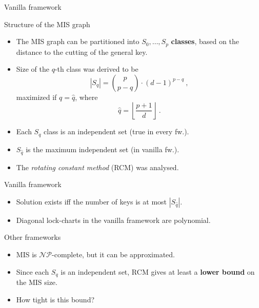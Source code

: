 \begin{frame}{Vanilla framework}
  \begin{block}{Structure of the MIS graph}
    \begin{itemize}
      \item The MIS graph can be partitioned into $S_0, \ldots, S_p$ \textbf{classes},
        based on the distance to the cutting of the general key.
      \item Size of the $q$-th class was derived to be
        $$|S_q| = \binom{p}{p-q}\cdot (d-1)^{p-q}\ ,$$
        maximized if $q=\hat q$, where
        $$\hat{q}=\left\lfloor \frac{p+1}{d}\right\rfloor\ .$$
      \pause
      \item Each $S_q$ class is an independent set (true in every fw.).
      \item $S_{\hat{q}}$ is the maximum independent set (in vanilla fw.).
      \pause
      \item The \textit{rotating constant method} (RCM) was analysed.
    \end{itemize}
  \end{block}
\end{frame}

\begin{frame}{Vanilla framework}
  \begin{itemize}
    \item Solution exists iff the number of keys is at most $|S_{\hat{q}}|$.
    \item Diagonal lock-charts in the vanilla framework are polynomial.
  \end{itemize}
\end{frame}


\begin{frame}{Other frameworks}
  \begin{itemize}
    \item MIS is $\mathcal{NP}$-complete, but it can be approximated.
    \pause
    \item Since each $S_q$ is an independent set,
      RCM gives at least a \textbf{lower bound} on the MIS size.
    \item How tight is this bound?
  \end{itemize}
\end{frame}

